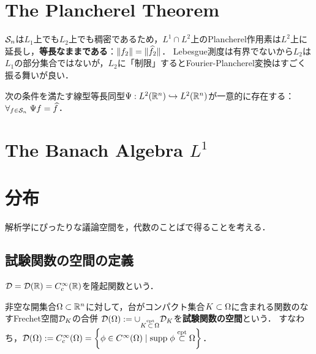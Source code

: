 \documentclass[uplatex,dvipdfmx]{jsreport}
\begin{document}
\section{The Plancherel Theorem}

\begin{tcolorbox}[colframe=ForestGreen, colback=ForestGreen!10!white,breakable,colbacktitle=ForestGreen!40!white,coltitle=black,fonttitle=\bfseries\sffamily,
title=$L^1$に入る前に，$L^2$上での完成された議論を見る]
    $\S_n$は$L_1$上でも$L_2$上でも稠密であるため，$L^1\cap L^2$上のPlancherel作用素は$L^2$上に延長し，\textbf{等長なままである}：$\norm{f_2}=\norm{\wh{f}_2}$．
    Lebesgue測度は有界でないから$L_2$は$L_1$の部分集合ではないが，$L_2$に「制限」するとFourier-Plancherel変換はすごく振る舞いが良い．
\end{tcolorbox}

\begin{theorem}
    次の条件を満たす線型等長同型$\Psi:L^2(\R^n)\mono L^2(\R^n)$が一意的に存在する：$\forall_{f\in\S_n}\;\Psi f=\wh{f}$．
\end{theorem}

\section{The Banach Algebra $L^1$}

\section{分布}

\begin{tcolorbox}[colframe=ForestGreen, colback=ForestGreen!10!white,breakable,colbacktitle=ForestGreen!40!white,coltitle=black,fonttitle=\bfseries\sffamily,
title=]
    解析学にぴったりな議論空間を，代数のことばで得ることを考える．
\end{tcolorbox}

\subsection{試験関数の空間の定義}

\begin{notation}
    $\D=\D(\R)=C_c^\infty(\R)$を隆起関数という．
\end{notation}

\begin{definition}
    非空な開集合$\Om\subset\R^n$に対して，台がコンパクト集合$K\subset\Om$に含まれる関数のなすFrechet空間$\D_K$の合併
    $\D(\Om):=\cup_{K\compsub\Om}\D_K$を\textbf{試験関数の空間}という．
    すなわち，$\D(\Om):=C^\infty_c(\Om)=\Brace{\phi\in C^\infty(\Om)\mid\supp\phi\compsub\Om}$．
\end{definition}
\end{document}
